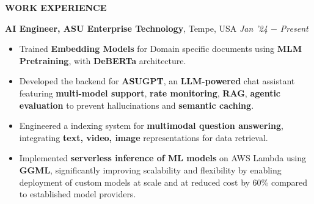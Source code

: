 \documentclass[10pt,a4]{article}
\def\hrulefill{\leavevmode\leaders\hrule height 1pt\hfill\kern0pt}		%
\begin{document}
{    %
		
\begin{flushleft}
    {\Large \textbf{WORK EXPERIENCE}} %

    \vspace{1.5mm}
    \hspace{1.5mm} \textbf{\large AI Engineer, ASU Enterprise Technology},   Tempe, USA \hfill \textit{\large Jan '24 $-$ Present}	\\
    \begin{itemize}
        \item Trained \textbf{Embedding Models} for Domain specific documents using \textbf{MLM Pretraining}, with  \textbf{DeBERTa} architecture.
        \item Developed the backend for \textbf{ASUGPT}, an \textbf{LLM-powered} chat assistant featuring \textbf{multi-model support}, \textbf{rate monitoring}, \textbf{RAG}, \textbf{agentic evaluation} to prevent hallucinations and \textbf{semantic caching}.

        \item Engineered a indexing system for \textbf{multimodal question answering}, integrating \textbf{text, video, image} representations for data retrieval.
        \item Implemented \textbf{serverless inference of ML models} on AWS Lambda using \textbf{GGML}, significantly improving scalability and flexibility by enabling deployment of custom models at scale and at reduced cost by 60\% compared to established model providers.


    \end{itemize}	
    

\end{flushleft}}
\end{document}
